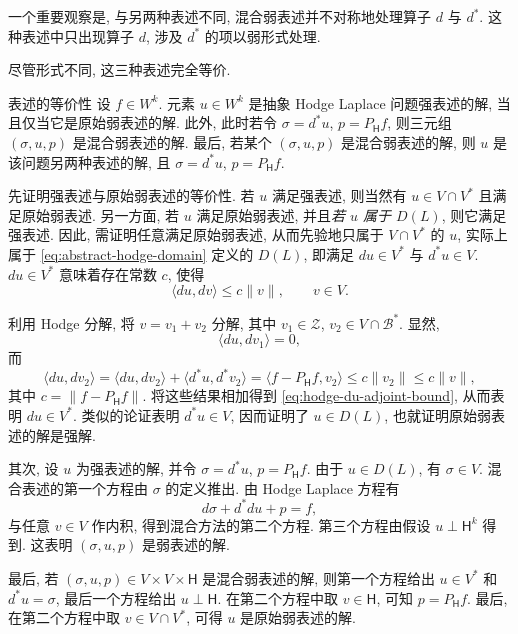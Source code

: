 {一个重要观察是, 与另两种表述不同, 混合弱表述并不对称地处理算子 $d$ 与 $d^*$. 这种表述中只出现算子 $d$, 涉及 $d^*$ 的项以弱形式处理.}

{尽管形式不同, 这三种表述完全等价.}


\begin{Theorem}{{表述的等价性}}\label{thm:hodge-formulation-equivalence}
{设 $f\in W^k$. 元素 $u\in W^k$ 是抽象 Hodge Laplace 问题强表述的解, 当且仅当它是原始弱表述的解. 此外, 此时若令 $\sigma=d^*u$, $p=P_{\mathsf H}f$, 则三元组 $(\sigma,u,p)$ 是混合弱表述的解. 最后, 若某个 $(\sigma,u,p)$ 是混合弱表述的解, 则 $u$ 是该问题另两种表述的解, 且 $\sigma=d^*u$, $p=P_{\mathsf H}f$.}
\end{Theorem}

\begin{Proof}
{先证明强表述与原始弱表述的等价性. 若 $u$ 满足强表述, 则当然有 $u\in V\cap V^*$ 且满足原始弱表述. 另一方面, 若 $u$ 满足原始弱表述, 并且\emph{若 $u$ 属于 $D(L)$}, 则它满足强表述. 因此, 需证明任意满足原始弱表述, 从而先验地只属于 $V\cap V^*$ 的 $u$, 实际上属于 \eqref{eq:abstract-hodge-domain} 定义的 $D(L)$, 即满足 $du\in V^*$ 与 $d^*u\in V$. $du\in V^*$ 意味着存在常数 $c$, 使得}
\begin{equation}\label{eq:hodge-du-adjoint-bound}
\langle du,dv\rangle\leq c\|v\|,\qquad v\in V.
\end{equation}

{利用 Hodge 分解, 将 $v=v_1+v_2$ 分解, 其中 $v_1\in\mathcal Z$, $v_2\in V\cap\mathcal B^*$. 显然,}
\[
\langle du,dv_1\rangle=0,
\]
{而}
\[
\langle du,dv_2\rangle=\langle du,dv_2\rangle+\langle d^*u,d^*v_2\rangle=\langle f-P_{\mathsf H}f,v_2\rangle\leq c\|v_2\|\leq c\|v\|,
\]
{其中 $c=\|f-P_{\mathsf H}f\|$. 将这些结果相加得到 \eqref{eq:hodge-du-adjoint-bound}, 从而表明 $du\in V^*$. 类似的论证表明 $d^*u\in V$, 因而证明了 $u\in D(L)$, 也就证明原始弱表述的解是强解.}

{其次, 设 $u$ 为强表述的解, 并令 $\sigma=d^*u$, $p=P_{\mathsf H}f$. 由于 $u\in D(L)$, 有 $\sigma\in V$. 混合表述的第一个方程由 $\sigma$ 的定义推出. 由 Hodge Laplace 方程有}
\[
d\sigma+d^*du+p=f,
\]
{与任意 $v\in V$ 作内积, 得到混合方法的第二个方程. 第三个方程由假设 $u\perp\mathsf H^k$ 得到. 这表明 $(\sigma,u,p)$ 是弱表述的解.}

{最后, 若 $(\sigma,u,p)\in V\times V\times\mathsf H$ 是混合弱表述的解, 则第一个方程给出 $u\in V^*$ 和 $d^*u=\sigma$, 最后一个方程给出 $u\perp\mathsf H$. 在第二个方程中取 $v\in\mathsf H$, 可知 $p=P_{\mathsf H}f$. 最后, 在第二个方程中取 $v\in V\cap V^*$, 可得 $u$ 是原始弱表述的解.}
\end{Proof}

